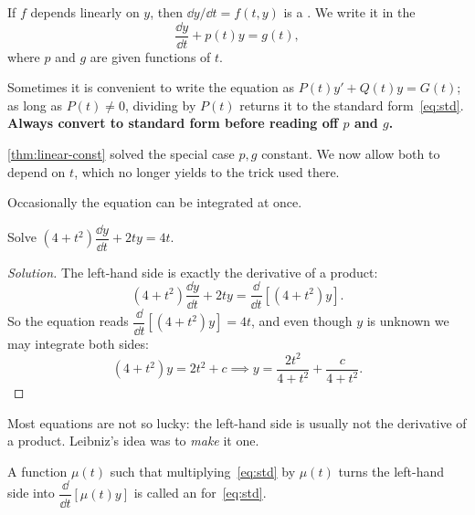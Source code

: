 
\begin{definition}
	If \(f\) depends linearly on \(y\), then \(\dd y/\dd t = f(t,y)\) is a
	. We write it in the 
	\begin{equation}\label{eq:std}
		\frac{\dd y}{\dd t} + p(t) y = g(t),
	\end{equation}
	where \(p\) and \(g\) are given functions of \(t\).
\end{definition}

\begin{remark}
	Sometimes it is convenient to write the equation as
	\(P(t) y' + Q(t) y = G(t)\); as long as \(P(t) \neq 0\), dividing by \(P(t)\) returns
	it to the standard form~\eqref{eq:std}. \textbf{Always convert to standard form before
		reading off \(p\) and \(g\).}
\end{remark}

\begin{remark}
	\autoref{thm:linear-const} solved the special case \(p, g\) constant. We now allow
	both to depend on \(t\), which no longer yields to the trick used there.
\end{remark}

Occasionally the equation can be integrated at once.

\begin{eg}
	Solve \((4 + t^2) \dfrac{\dd y}{\dd t} + 2ty = 4t\).
\end{eg}

\begin{proof}[Solution]
	The left-hand side is exactly the derivative of a product:
	\[
		(4 + t^2)\frac{\dd y}{\dd t} + 2ty = \frac{\dd}{\dd t}\left[ (4 + t^2) y \right].
	\]
	So the equation reads \(\dfrac{\dd}{\dd t}\left[ (4+t^2) y \right] = 4t\), and even
	though \(y\) is unknown we may integrate both sides:
	\[
		(4 + t^2) y = 2t^2 + c
		\implies
		y = \frac{2t^2}{4 + t^2} + \frac{c}{4 + t^2}.
	\]
\end{proof}

Most equations are not so lucky: the left-hand side is usually not the derivative of a
product. Leibniz's idea was to \emph{make} it one.

\begin{definition}
	A function \(\mu(t)\) such that multiplying~\eqref{eq:std} by \(\mu(t)\) turns the
	left-hand side into \(\dfrac{\dd}{\dd t}\left[ \mu(t) y \right]\) is called an
	 for~\eqref{eq:std}.
\end{definition}

